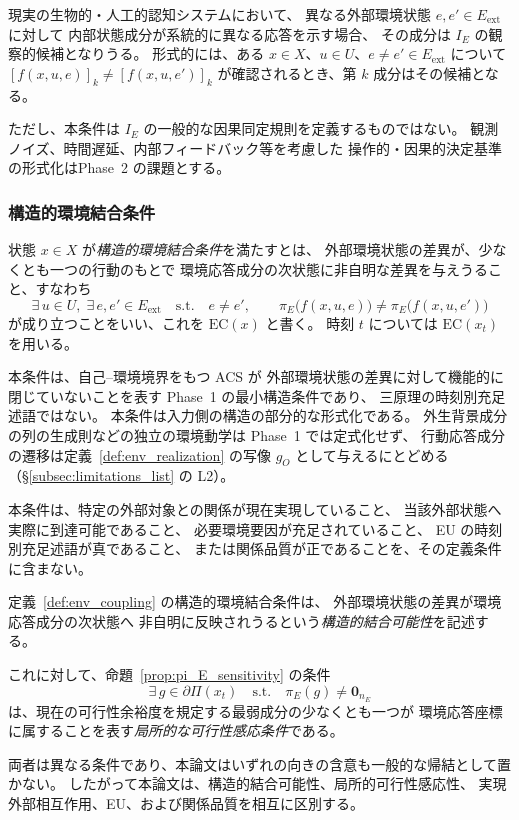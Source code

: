 \begin{remark}[環境応答成分の観察的対応]
\label{rem:env_response_observation}
現実の生物的・人工的認知システムにおいて、
異なる外部環境状態 $e,e'\in E_{\mathrm{ext}}$ に対して
内部状態成分が系統的に異なる応答を示す場合、
その成分は $I_E$ の観察的候補となりうる。
形式的には、ある
$x\in X$、$u\in U$、$e\neq e'\in E_{\mathrm{ext}}$ について
$[f(x,u,e)]_k\neq [f(x,u,e')]_k$
が確認されるとき、第 $k$ 成分はその候補となる。

ただし、本条件は $I_E$ の一般的な因果同定規則を定義するものではない。
観測ノイズ、時間遅延、内部フィードバック等を考慮した
操作的・因果的決定基準の形式化はPhase~2 の課題とする。
\end{remark}

\subsubsection{構造的環境結合条件}

\begin{definition}
\label{def:env_coupling}
状態 $x\in X$ が\emph{構造的環境結合条件}を満たすとは、
外部環境状態の差異が、少なくとも一つの行動のもとで
環境応答成分の次状態に非自明な差異を与えうること、すなわち
\[
  \exists\,u\in U,\;
  \exists\,e,e'\in E_{\mathrm{ext}}
  \quad\text{s.t.}\quad
  e\neq e',
  \qquad
  \pi_E\bigl(f(x,u,e)\bigr)
  \neq
  \pi_E\bigl(f(x,u,e')\bigr)
\]
が成り立つことをいい、これを $\mathrm{EC}(x)$ と書く。
時刻 $t$ については $\mathrm{EC}(x_t)$ を用いる。

本条件は、自己--環境境界をもつ ACS が
外部環境状態の差異に対して機能的に閉じていないことを表す
Phase~1 の最小構造条件であり、
三原理の時刻別充足述語ではない。
本条件は入力側の構造の部分的な形式化である。
外生背景成分の列の生成則などの独立の環境動学は Phase~1 では定式化せず、
行動応答成分の遷移は定義~\ref{def:env_realization} の写像 $g_O$ として与えるにとどめる
（\S\ref{subsec:limitations_list} の L2）。

本条件は、特定の外部対象との関係が現在実現していること、
当該外部状態へ実際に到達可能であること、
必要環境要因が充足されていること、
EU の時刻別充足述語が真であること、
または関係品質が正であることを、その定義条件に含まない。
\end{definition}

\begin{remark}[構造的環境結合条件と一般化勾配感応性の区別]
\label{rem:ro_two_layer_intuition}
定義~\ref{def:env_coupling} の構造的環境結合条件は、
外部環境状態の差異が環境応答成分の次状態へ
非自明に反映されうるという\emph{構造的結合可能性}を記述する。

これに対して、命題~\ref{prop:pi_E_sensitivity} の条件
\[
  \exists\,g\in\partial\Pi(x_t)
  \quad\text{s.t.}\quad
  \pi_E(g)\neq\mathbf{0}_{n_E}
\]
は、現在の可行性余裕度を規定する最弱成分の少なくとも一つが
環境応答座標に属することを表す\emph{局所的な可行性感応条件}である。

両者は異なる条件であり、本論文はいずれの向きの含意も一般的な帰結として置かない。
したがって本論文は、構造的結合可能性、局所的可行性感応性、
実現外部相互作用、EU、および関係品質を相互に区別する。
\end{remark}

